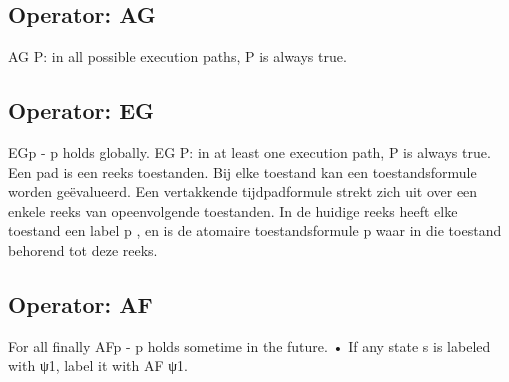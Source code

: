 \documentclass{article}
\begin{document}
	\subsection{Operator: AG}

	
	AG P: in all possible execution paths, P is always true. 
	
	
	
	\subsection{Operator: EG}
	EGp - p holds globally.
	EG P: in at least one execution path, P is always true.
	Een pad is een reeks toestanden. Bij elke toestand kan een toestandsformule worden geëvalueerd. Een vertakkende tijdpadformule strekt zich uit over een enkele reeks van opeenvolgende toestanden.
	In de huidige reeks heeft elke toestand een label p , en  is de atomaire toestandsformule p waar in die toestand behorend tot deze reeks.
	
	
	\subsection{Operator: AF}
	For all finally
	AFp - p holds sometime in the future.
	• If any state s is labeled with ψ1, label it with AF ψ1.
	
\end{document}
